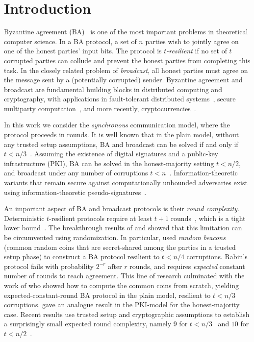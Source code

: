 \section{Introduction}\label{sec:intro}
Byzantine agreement (BA)~\cite{PSL80,LSP82} is one of the most important problems in theoretical computer science. In
a BA protocol, a set of $n$ parties wish to jointly agree on one of the honest parties' input bits.
The protocol is \emph{$t$-resilient} if no set of $t$ corrupted parties can collude and prevent the honest parties from completing this task.
In the closely related problem of \emph{broadcast}, all honest parties must agree on the message sent by a (potentially corrupted) sender.
Byzantine agreement and broadcast are fundamental building blocks in distributed computing and cryptography, with applications in fault-tolerant distributed systems~\cite{CL99,KBCCEGGRWWWZ00}, secure multiparty computation~\cite{Yao82,GMW87,BGW88,CCD88}, and more recently, cryptocurrencies~\cite{SM16,GHMVZ17,PS18}.

In this work we consider the \emph{synchronous} communication model, where the protocol proceeds in rounds. It is well known that in the plain model, without any trusted setup assumptions, BA and broadcast can be solved if and only if $t<n/3$~\cite{PSL80,LSP82,FLM85,GM93}. Assuming the existence of digital signatures and a public-key infrastructure (PKI), BA can be solved in the honest-majority setting $t<n/2$, and broadcast under any number of corruptions $t<n$~\cite{DS83}. Information-theoretic variants that remain secure against computationally unbounded adversaries exist using information-theoretic pseudo-signatures~\cite{PW92}.

An important aspect of BA and broadcast protocols is their \emph{round complexity}. Deterministic $t$-resilient protocols require at least $t+1$ rounds~\cite{FL82,DS83}, which is a tight lower bound~\cite{DS83,GM93}. The breakthrough results of \citet{Ben-Or83} and \citet{Rabin83} showed that this limitation can be circumvented using randomization. In particular, \citet{Rabin83} used \emph{random beacons} (common random coins that are secret-shared among the parties in a trusted setup phase) to construct a BA protocol resilient to $t<n/4$ corruptions. Rabin's protocol fails with probability $2^{-r}$ after $r$ rounds, and requires \emph{expected} constant number of rounds to reach agreement. This line of research culminated with the work of \citet{FM97} who showed how to compute the common coins from scratch, yielding expected-constant-round BA protocol in the plain model, resilient to $t<n/3$ corruptions. \citet{KK06} gave an analogue result in the PKI-model for the honest-majority case. Recent results use trusted setup and cryptographic assumptions to establish a surprisingly small expected round complexity, namely $9$ for $t<n/3$~\cite{Micali17} and $10$ for $t<n/2$~\cite{MV17,ADDNR19}.

